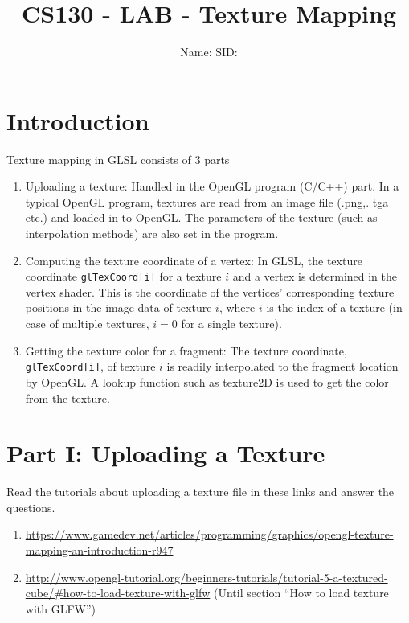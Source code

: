 \documentclass[12pt]{article}
\newcommand{\TODOL}[1]{\textcolor{red}{\underline{\hspace{#1 cm}}}}
\begin{document}
\title{CS130 - LAB - Texture Mapping}
\date{}
\author{Name: \TODOL7\qquad\qquad SID: \TODOL4}
\maketitle
\begin{center}
\end{center}

\section*{Introduction}

Texture mapping in GLSL consists of 3 parts
\begin{enumerate}
\item Uploading a texture: Handled in the OpenGL program (C/C++) part. In a typical
  OpenGL program, textures are read from an image file (.png,.  tga etc.) and
  loaded in to OpenGL. The parameters of the texture (such as interpolation
  methods) are also set in the program.
\item Computing the texture coordinate of a vertex: In GLSL, the texture
  coordinate \texttt{glTexCoord[i]} for a texture $i$ and a vertex is determined in the
  vertex shader. This is the coordinate of the vertices' corresponding texture
  positions in the image data of texture $i$, where $i$ is the index of a texture
  (in case of multiple textures, $i = 0$ for a single texture).
\item Getting the texture color for a fragment: The texture coordinate,
  \texttt{glTexCoord[i]}, of texture $i$ is readily interpolated to the fragment
  location by OpenGL. A lookup function such as texture2D is used to get the
  color from the texture.
\end{enumerate}

\section*{Part I: Uploading a Texture}

Read the tutorials about uploading a texture file in these links and answer the
questions.

\begin{enumerate}
\item \href{https://www.gamedev.net/articles/programming/graphics/opengl-texture-mapping-an-introduction-r947/}{https://www.gamedev.net/articles/programming/graphics/opengl-texture-mapping-an-introduction-r947}
\item \href{http://www.opengl-tutorial.org/beginners-tutorials/tutorial-5-a-textured-cube/\#how-to-load-texture-with-glfw}{http://www.opengl-tutorial.org/beginners-tutorials/tutorial-5-a-textured-cube/\#how-to-load-texture-with-glfw}
  (Until section ``How to load texture with GLFW'')
\end{enumerate}
\end{document}

